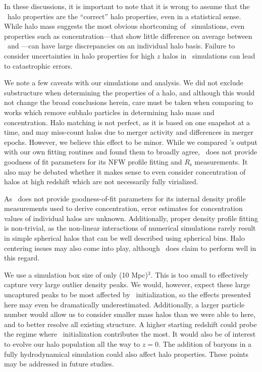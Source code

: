 In these discussions, it is important to note that it is wrong to assume that the \za\ halo properties are the ``correct'' halo properties, even in a statistical sense.  While halo mass suggests the most obvious shortcoming of \za\ simulations, even properties such as concentration---that show little difference on average between \lpt\ and \za---can have large discrepancies on an individual halo basis.  Failure to consider uncertainties in halo properties for high $z$ halos in \za\ simulations can lead to catastrophic errors.





We note a few caveats with our simulations and analysis.  We did not exclude substructure when determining the properties of a halo, and although this would not change the broad conclusions herein, care must be taken when comparing to works which remove subhalo particles in determining halo mass and concentration.  Halo matching is not perfect, as it is based on one snapshot at a time, and may miss-count halos due to merger activity and differences in merger epochs.  However, we believe this effect to be minor.  While we compared \rockstar's output with our own fitting routines and found them to broadly agree, \rockstar\ does not provide goodness of fit parameters for its NFW profile fitting and $R_{\mathrm{s}}$ measurements.  It also may be debated whether it makes sense to even consider concentration of halos at high redshift which are not necessarily fully virialized.

As \rockstar\ does not provide goodness-of-fit parameters for its internal density profile measurements used to derive concentration, error estimates for concentration values of individual halos are unknown.  Additionally, proper density profile fitting is non-trivial, as the non-linear interactions of numerical simulations rarely result in simple spherical halos that can be well described using spherical bins.  Halo centering issues may also come into play, although \rockstar\ does claim to perform well in this regard.

We use a simulation box size of only (10 Mpc)$^{3}$.  This is too small to effectively capture very large outlier density peaks.  We would, however, expect these large uncaptured peaks to be most affected by \lpt\ initialization, so the effects presented here may even be dramatically underestimated.  Additionally, a larger particle number would allow us to consider smaller mass halos than we were able to here, and to better resolve all existing structure.  A higher starting redshift could probe the regime where \lpt\ initialization contributes the most.  It would also be of interest to evolve our halo population all the way to $z = 0$.  The addition of baryons in a fully hydrodynamical simulation could also affect halo properties.  These points may be addressed in future studies.




